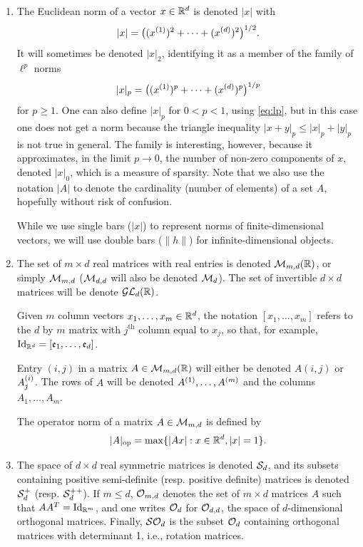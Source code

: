 \begin{enumerate}[label={\bf \arabic*.}]
 
 \item
 The Euclidean norm of a vector $x\in {\mathbb{R}}^d$ is denoted $|x|$ with 
 \[
 |x| = \big((x^{(1)})^2 + \cdots + (x^{(d)})^2\big)^{1/2}.
 \]
 It will sometimes be denoted $|x|_2$, identifying it as a member of the family of $\ell^p$ norms
 \begin{equation}
 |x|_p = \big((x^{(1)})^p + \cdots + (x^{(d)})^p\big)^{1/p}
\label{eq:lp} 
 \end{equation}
 for $p\geq 1$. One can also define $|x|_p$ for $0<p<1$, using \cref{eq:lp}, but in this case one does not get a norm because the triangle inequality $|x+y|_p \leq |x|_p + |y|_p$ is not true in general. The family is interesting, however, because it approximates, in the limit $p\to 0$,  the number of non-zero components of $x$, denoted $|x|_0$, which is a measure of { sparsity}. Note that we  also use the notation $|A|$ to denote the cardinality (number of elements) of a set $A$, hopefully without risk of confusion.
 
While we use single bars ($|x|$) to represent norms of finite-dimensional vectors, we will use double bars ($\|h\|$) for infinite-dimensional objects.
 
 \item 
 The set of $m\times d$ real matrices with real entries is denoted ${\mathcal M}_{m,d}({\mathbb{R}})$, or simply ${\mathcal M}_{m,d}$ (${\mathcal M}_{d,d}$ will also be denoted ${\mathcal M}_d$).  The set of invertible $d\times d$ matrices will be denote ${\mathcal G}{\mathcal L}_d({\mathbb{R}})$.

 Given $m$ column vectors $x_1, \ldots, x_m\in {\mathbb{R}}^d$, the notation $[x_1, \ldots, x_m]$ refers to the $d$ by $m$ matrix with $j^{\mathrm{th}}$ column equal to $x_j$, so that, for example, $\Id[d] = [\mathfrak e_1, \ldots, \mathfrak e_d]$.

Entry $(i,j)$ in a matrix $A\in {\mathcal M}_{m,d}({\mathbb{R}})$ will either be denoted $A(i,j)$ or $A_j^{(i)}$. The rows of $A$ will be denoted $A^{(1)}, \ldots,A^{(m)}$ and the columns $A_1, \ldots, A_m$.    


 The operator norm of a matrix $A\in {\mathcal M}_{m,d}$ is defined by
 \[
 |A|_{\mathrm{op}} = \max\{|Ax|: x\in {\mathbb{R}}^d, |x|=1\}.
 \]
 
\item  The space of  $d \times d$ real symmetric matrices is denoted ${\mathcal S}_d$, and its subsets containing positive semi-definite  (resp. positive definite) matrices is denoted ${\mathcal S}^+_d$ (resp. ${\mathcal S}^{++}_d$). If $m\leq d$, ${\mathcal O}_{m,d}$ denotes the set of $m\times d$ matrices $A$ such that $AA^T = \Id[m]$, and one writes ${\mathcal O}_d$ for ${\mathcal O}_{d,d}$, the space of $d$-dimensional orthogonal matrices. Finally, ${\mathcal S}{\mathcal O}_d$ is the subset ${\mathcal O}_d$ containing orthogonal matrices with determinant 1, i.e., rotation matrices.
 

\end{enumerate}
